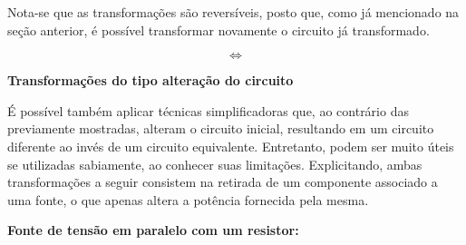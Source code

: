 \documentclass{article}
\numberwithin{equation}{section}
\newlength\Colsep
\begin{document}
Nota-se que as transformações são reversíveis, posto que, como já mencionado na seção anterior, é possível transformar novamente o circuito já transformado.

\noindent\begin{minipage}{\textwidth}
\begin{minipage}[c][4cm][c]{\dimexpr0.45\textwidth-0.5\Colsep\relax}
    \begin{center}
    \end{center}
\end{minipage} \hfill
\begin{minipage}[c][4cm][c]{\dimexpr0.1\textwidth-0.5\Colsep\relax}
    $$\iff$$
\end{minipage} \hfill
\begin{minipage}[c][4cm][c]{\dimexpr0.45\textwidth-0.5\Colsep\relax}
    \begin{center}
    \end{center}
\end{minipage}
\end{minipage}

\vspace{5mm}

\noindent\textbf{Transformações do tipo alteração do circuito}
\vspace{2mm}

É possível também aplicar técnicas simplificadoras que, ao contrário das previamente mostradas, alteram o circuito inicial, resultando em um circuito diferente ao invés de um circuito equivalente. Entretanto, podem ser muito úteis se utilizadas sabiamente, ao conhecer suas limitações. Explicitando, ambas transformações a seguir consistem na retirada de um componente associado a uma fonte, o que apenas altera a potência fornecida pela mesma.

\vspace{2mm}

\textbf{\small{\textbullet} Fonte de tensão em paralelo com um resistor:}
\end{document}
